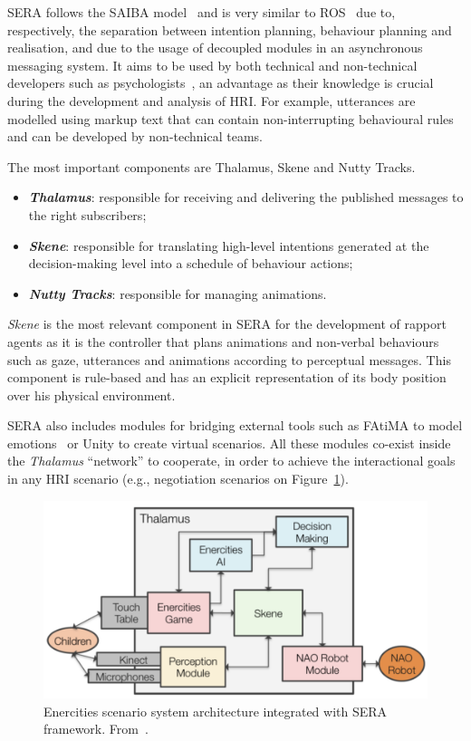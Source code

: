 \ac{SERA} follows the SAIBA model~\cite{Kopp2006} and is very similar to \ac{ROS}~\cite{Quigley2009} due to, respectively, the separation between intention planning, behaviour planning and realisation, and due to the usage of decoupled modules in an asynchronous messaging system. It aims to be used by both technical and non-technical developers such as psychologists~\cite{Tullio2015}, an advantage as their knowledge is crucial during the development and analysis of \ac{HRI}. For example, utterances are modelled using markup text that can contain non-interrupting behavioural rules and can be developed by non-technical teams.

The most important components are Thalamus, Skene and Nutty Tracks.
\begin{itemize}
	\item \textbf{\textit{Thalamus}}: responsible for receiving and delivering the published messages to the right subscribers;
	\item \textbf{\textit{Skene}}: responsible for translating high-level intentions generated at the decision-making level into a schedule of behaviour actions;
	\item \textbf{\textit{Nutty Tracks}}: responsible for managing animations.
\end{itemize}

\textit{Skene} is the most relevant component in \ac{SERA} for the development of rapport agents as it is the controller that plans animations and non-verbal behaviours such as gaze, utterances and animations according to perceptual messages. This component is rule-based and has an explicit representation of its body position over his physical environment. 

SERA also includes modules for bridging external tools such as \ac{FAtiMA} to model emotions~\cite{Dias2011} or Unity to create virtual scenarios. All these modules co-exist inside the \textit{Thalamus} ``network'' to cooperate, in order to achieve the interactional goals in any \ac{HRI} scenario (e.g., negotiation scenarios on Figure~\ref{fig:SERA:Examples}).

\begin{figure}
	\centering
	\includegraphics[width=0.6\linewidth]{images/SERA_ExSystemEC.png}
	\caption{Enercities scenario system architecture integrated with SERA framework. From~\cite{Tullio2015}.}
	\label{fig:SERA:Examples}
\end{figure}

